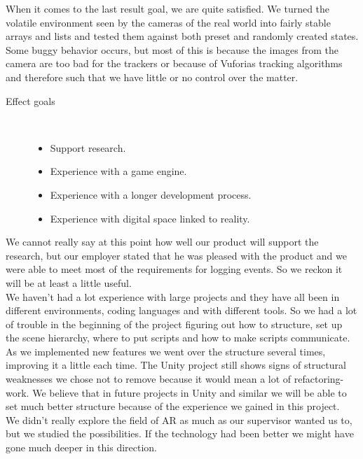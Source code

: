 When it comes to the last result goal, we are quite satisfied.
We turned the volatile environment seen by the cameras of the real world
into fairly stable arrays and lists and tested them against both preset 
and randomly created states. Some buggy behavior occurs, but most of this
is because the images from the camera are too bad for the trackers or because
of Vuforias tracking algorithms and therefore such that we have little or no 
control over the matter.

\clearpage

\begin{description}
	\item[Effect goals]\ 
	\begin{itemize}
		\item Support research.
		\item Experience with a game engine.
		\item Experience with a longer development process.
		\item Experience with digital space linked to reality.
	\end{itemize}
\end{description}
We cannot really say at this point how well our product will support the research, but our employer stated that he was pleased with the product and we were able to meet most of the requirements for logging events. 
So we reckon it will be at least a little useful.\\
We haven't had a lot experience with large projects and they have all been in different environments, coding languages and with different tools. 
So we had a lot of trouble in the beginning of the project figuring out how to structure, set up the scene hierarchy, where to put scripts and how to make scripts communicate.
As we implemented new features we went over the structure several times, improving it a little each time. 
The Unity project still shows signs of structural weaknesses we chose not to remove because it would mean a lot of refactoring-work. 
We believe that in future projects in Unity and similar we will be able to set much better structure because of the experience we gained in this project.\\
We didn't really explore the field of AR as much as our supervisor wanted us to, but we studied the possibilities. 
If the technology had been better we might have gone much deeper in this direction.
